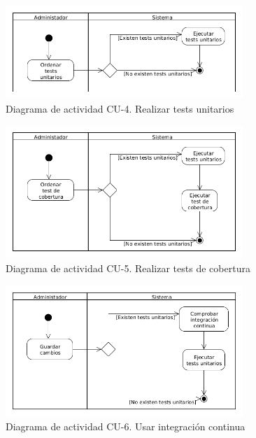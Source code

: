\begin{figure}[!hbt]
  \begin{center}
  \includegraphics[width=0.8\textwidth]{imagenes/diagrama_actividad_cu_4.png}
  \caption{Diagrama de actividad CU-4. Realizar tests unitarios}
  \label{fig:diag_ca_us_4}
  \end{center}
\end{figure}

\begin{figure}[!hbt]
  \begin{center}
  \includegraphics[width=0.8\textwidth]{imagenes/diagrama_actividad_cu_5.png}
  \caption{Diagrama de actividad CU-5. Realizar tests de cobertura}
  \label{fig:diag_ca_us_5}
  \end{center}
\end{figure}

\begin{figure}[!hbt]
  \begin{center}
  \includegraphics[width=0.8\textwidth]{imagenes/diagrama_actividad_cu_6.png}
  \caption{Diagrama de actividad CU-6. Usar integración continua}
  \label{fig:diag_ca_us_6}
  \end{center}
\end{figure}

